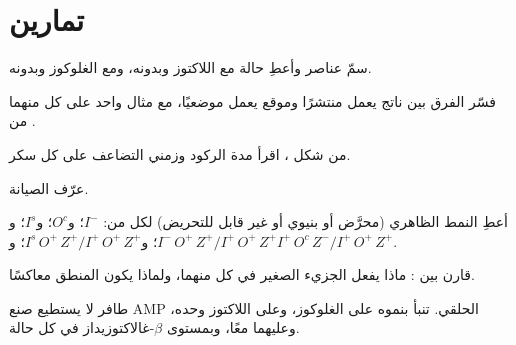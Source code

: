 \section{تمارين}

\begin{exercise}[$\star$]\label{exo:b1:expression-control:1}
سمّ عناصر  وأعطِ حالة  مع اللاكتوز وبدونه،
ومع الغلوكوز وبدونه.
\end{exercise}

\begin{exercise}[$\star$]\label{exo:b1:expression-control:2}
فسّر الفرق بين ناتج  يعمل منتشرًا وموقع يعمل موضعيًا، مع
مثال واحد على كل منهما من .
\end{exercise}

\begin{exercise}[$\star$]\label{exo:b1:expression-control:3}
من شكل ، اقرأ مدة الركود وزمني التضاعف على كل
سكر.
\end{exercise}

\begin{exercise}[$\star$]\label{exo:b1:expression-control:4}
عرّف    الصيانة.
\end{exercise}

\begin{exercise}[$\star\star$]\label{exo:b1:expression-control:5}
أعطِ النمط الظاهري (محرَّض أو بنيوي أو غير قابل للتحريض) لكل من:
$I^-$؛ و$O^c$؛ و$I^s$؛ و$I^-\,O^+\,Z^+ / I^+\,O^+\,Z^+$؛
و$I^s\,O^+\,Z^+ /
I^+\,O^+\,Z^+$؛ و$I^+\,O^c\,Z^- / I^+\,O^+\,Z^+$.
\end{exercise}

\begin{exercise}[$\star\star$]\label{exo:b1:expression-control:6}
قارن بين  : ماذا يفعل الجزيء
الصغير  في كل منهما، ولماذا يكون المنطق معاكسًا.
\end{exercise}

\begin{exercise}[$\star\star$]\label{exo:b1:expression-control:7}
طافر لا يستطيع صنع AMP الحلقي. تنبأ بنموه على الغلوكوز، وعلى
اللاكتوز وحده، وعليهما معًا، وبمستوى $\beta$-غالاكتوزيداز في كل
حالة.
\end{exercise}

